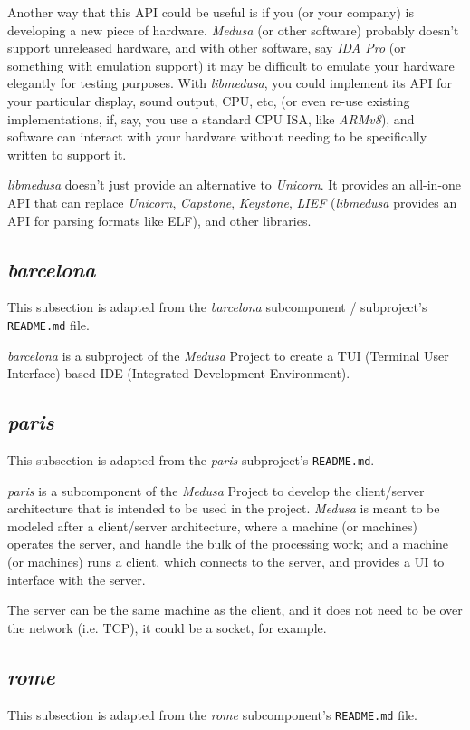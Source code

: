 \documentclass{report}
\begin{document}
	Another way that this API could be useful is if you (or your company) is
	developing a new piece of hardware. \textit{Medusa} (or other software)
	probably doesn't support unreleased hardware, and with other software, say
	\textit{IDA Pro} (or something with emulation support) it may be difficult
	to emulate your hardware elegantly for testing purposes. With
	\textit{libmedusa}, you could implement its API for your particular display,
	sound output, CPU, etc, (or even re-use existing implementations, if, say,
	you use a standard CPU ISA, like \textit{ARMv8}), and software can interact
	with your hardware without needing to be specifically written to support it.

	\textit{libmedusa} doesn't just provide an alternative to \textit{Unicorn}.
	It provides an all-in-one API that can replace \textit{Unicorn},
	\textit{Capstone}, \textit{Keystone}, \textit{LIEF} (\textit{libmedusa}
	provides an API for parsing formats like ELF), and other libraries.

	\subsection{\textit{barcelona}}
	This subsection is adapted from the \textit{barcelona} subcomponent /
	subproject's \texttt{README.md} file.

	\textit{barcelona} is a subproject of the \textit{Medusa} Project to create
	a TUI (Terminal User Interface)-based IDE (Integrated Development
	Environment).

	\subsection{\textit{paris}}
	This subsection is adapted from the \textit{paris} subproject's
	\texttt{README.md}.

	\textit{paris} is a subcomponent of the \textit{Medusa} Project to develop
	the client/server architecture that is intended to be used in the project.
	\textit{Medusa} is meant to be modeled after a client/server architecture,
	where a machine (or machines) operates the server, and handle the bulk of
	the processing work; and a machine (or machines) runs a client, which
	connects to the server, and provides a UI to interface with the server.

	The server can be the same machine as the client, and it does not need to be
	over the network (i.e. TCP), it could be a socket, for example.

	\subsection{\textit{rome}}
	This subsection is adapted from the \textit{rome} subcomponent's
	\texttt{README.md} file.
\end{document}
